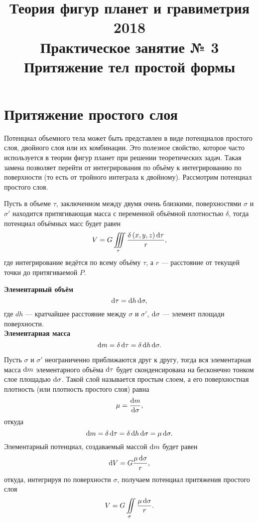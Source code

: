 \documentclass[11pt, a4paper]{article}
\title{{\Large Теория фигур планет и гравиметрия 2018}\\ 
    {\bf\Large Практическое занятие № 3} \\
{\Large Притяжение тел простой формы}}
\author{}
\date{\DTMusedate{lessondate}}
\theoremstyle{plain}
\theoremstyle{definition}
\theoremstyle{remark}
\begin{document}
\maketitle

\section{Притяжение простого слоя}

Потенциал объемного тела может быть представлен в виде потенциалов простого слоя, двойного слоя или
их комбинации. Это полезное свойство, которое часто используется в теории фигур планет при
решении теоретических задач. Такая замена позволяет перейти от интегрирования по объёму к
интегрированию по поверхности (то есть от тройного интеграла к двойному). Рассмотрим потенциал
простого слоя.

Пусть в объеме $\tau$, заключенном между двумя очень близкими, поверхностями $\sigma$ и $\sigma'$
находится притягивающая масса с переменной объёмной плотностью $\delta$, тогда потенциал объёмных
масс будет равен
\begin{equation*}
    V = G\iiint\limits_{\tau}\dfrac{\delta \left( x, y, z \right)\dif\tau}{r},
\end{equation*}
где интегрирование ведётся по всему объёму $\tau$, а $r$ --- расстояние от текущей 
точки до притягиваемой $P$.

\textbf{Элементарный объём}
\begin{equation*}
    \dif\tau = \dif h\dif\sigma,
\end{equation*}
где $dh$ --- кратчайшее расстояние между $\sigma$ и $\sigma'$,
$\dif\sigma$ --- элемент площади поверхности. \\

\textbf{Элементарная масса}
\begin{equation*}
    \dif m = \delta\dif\tau = \delta\dif h\dif\sigma.
\end{equation*}

Пусть $\sigma$ и $\sigma'$ неограниченно приближаются друг к другу, тогда вся элементарная масса
$\dif m$ элементарного объёма $\dif\tau$ будет сконденсирована на бесконечно тонком слое площадью
$\dif\sigma$. Такой слой называется простым слоем, а его поверхностная плотность (или плотность
простого слоя) равна
\begin{equation*}
    \mu = \dfrac{\dif m }{\dif \sigma},
\end{equation*}
откуда
\begin{equation*}
    \dif m = \delta\dif\tau = \delta\dif h\dif\sigma = \mu\dif\sigma. 
\end{equation*}
Элементарный потенциал, создаваемый массой $\dif m$ будет равен
\begin{equation*}
    \dif V = G\dfrac{\mu\dif\sigma}{r},
\end{equation*}
откуда, интегрируя по поверхности $\sigma$, получаем потенциал притяжения простого слоя
\begin{equation*}
    V = G\iint\limits_{\sigma}\dfrac{\mu\dif\sigma}{r}.
\end{equation*}
\end{document}
